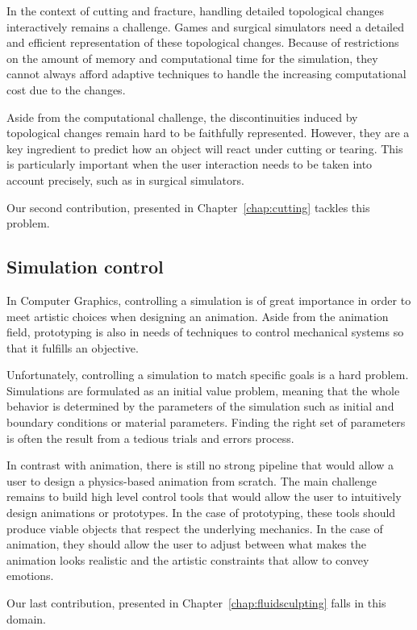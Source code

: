 In the context of cutting and fracture, handling detailed topological changes interactively remains a challenge. Games and surgical simulators need a detailed and efficient representation of these topological changes. Because of restrictions on the amount of memory and computational time for the simulation, they cannot always afford adaptive techniques to handle the increasing computational cost due to the changes.

Aside from the computational challenge, the discontinuities induced by topological changes remain hard to be faithfully represented. However, they are a key ingredient to predict how an object will react under cutting or tearing.
This is particularly important when the user interaction needs to be taken into account precisely, such as in surgical simulators.

Our second contribution, presented in Chapter~\ref{chap:cutting} tackles this problem.

\subsection{Simulation control}

In Computer Graphics, controlling a simulation is of great importance in order to meet artistic choices when designing an animation. Aside from the animation field, prototyping is also in needs of techniques to control mechanical systems so that it fulfills an objective.

Unfortunately, controlling a simulation to match specific goals is a hard problem. 
Simulations are formulated as an initial value problem, meaning that the whole behavior is determined by the parameters of the simulation such as initial and boundary conditions or material parameters. 
Finding the right set of parameters is often the result from a tedious trials and errors process.

In contrast with animation, there is still no strong pipeline that would allow a user to design a physics-based animation from scratch. 
The main challenge remains to build high level control tools that would allow the user to intuitively design animations or prototypes. 
In the case of prototyping, these tools should produce viable objects that respect the underlying mechanics. 
In the case of animation, they should allow the user to adjust between what makes the animation looks realistic and the artistic constraints that allow to convey emotions.

Our last contribution, presented in Chapter~\ref{chap:fluidsculpting} falls in this domain.


